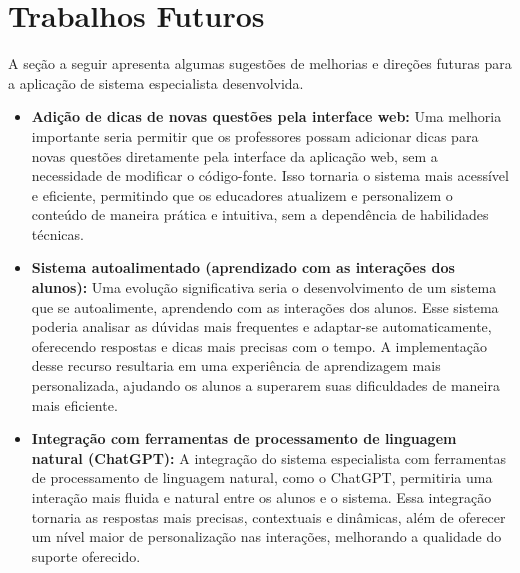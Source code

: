 \section{Trabalhos Futuros}

A seção a seguir apresenta algumas sugestões de melhorias e direções futuras para a aplicação de sistema especialista desenvolvida. 

\begin{itemize}
    \item  \textbf{Adição de dicas de novas questões pela interface web:} Uma melhoria importante seria permitir que os professores possam adicionar dicas para novas questões diretamente pela interface da aplicação web, sem a necessidade de modificar o código-fonte. Isso tornaria o sistema mais acessível e eficiente, permitindo que os educadores atualizem e personalizem o conteúdo de maneira prática e intuitiva, sem a dependência de habilidades técnicas.
    \item  \textbf{Sistema autoalimentado (aprendizado com as interações dos alunos):} Uma evolução significativa seria o desenvolvimento de um sistema que se autoalimente, aprendendo com as interações dos alunos. Esse sistema poderia analisar as dúvidas mais frequentes e adaptar-se automaticamente, oferecendo respostas e dicas mais precisas com o tempo. A implementação desse recurso resultaria em uma experiência de aprendizagem mais personalizada, ajudando os alunos a superarem suas dificuldades de maneira mais eficiente.
    \item  \textbf{Integração com ferramentas de processamento de linguagem natural (ChatGPT):} A integração do sistema especialista com ferramentas de processamento de linguagem natural, como o ChatGPT, permitiria uma interação mais fluida e natural entre os alunos e o sistema. Essa integração tornaria as respostas mais precisas, contextuais e dinâmicas, além de oferecer um nível maior de personalização nas interações, melhorando a qualidade do suporte oferecido.
\end{itemize}



